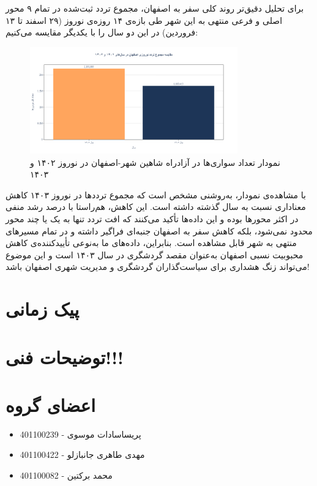 \documentclass[a4paper, 12pt]{article}
\begin{document}
\newpage
برای تحلیل دقیق‌تر روند کلی سفر به اصفهان، مجموع تردد ثبت‌شده در تمام ۹ محور اصلی و فرعی منتهی به این شهر طی بازه‌ی ۱۴ روزه‌ی نوروز (۲۹ اسفند تا ۱۳ فروردین) در این دو سال را با یکدیگر مقایسه می‌کنیم:
\begin{figure}[htbp]
    \centering
    \includegraphics[width=0.8\textwidth]{all_isf.png}
    \caption{نمودار تعداد سواری‌ها در آزادراه شاهین شهر-اصفهان در نوروز ۱۴۰۲ و ۱۴۰۳}
\end{figure}
با مشاهده‌ی نمودار، به‌روشنی مشخص است که مجموع ترددها در نوروز ۱۴۰۳ کاهش معناداری نسبت به سال گذشته داشته است. این کاهش، هم‌راستا با درصد رشد منفی در اکثر محورها بوده و این داده‌ها تأکید می‌کنند که افت تردد تنها به یک یا چند محور محدود نمی‌شود، بلکه کاهش سفر به اصفهان جنبه‌ای فراگیر داشته و در تمام مسیرهای منتهی به شهر قابل مشاهده است. بنابراین، داده‌های ما به‌نوعی تأییدکننده‌ی کاهش محبوبیت نسبی اصفهان به‌عنوان مقصد گردشگری در سال ۱۴۰۳ است و این موضوع می‌تواند زنگ هشداری برای سیاست‌گذاران گردشگری و مدیریت شهری اصفهان باشد!


\newpage
\section{پیک زمانی}

\section{توضیحات فنی!!!}

\section{اعضای گروه}
\begin{itemize}
    \item پریساسادات موسوی - 401100239
    \item مهدی طاهری جانبازلو - 401100422
    \item محمد برکتین - 401100082
\end{itemize}
\end{document}
